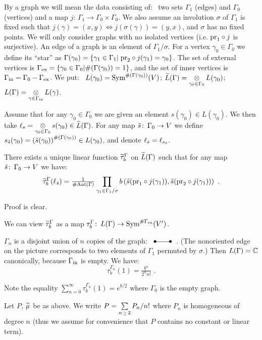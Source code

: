 By a graph we will mean the data consisting of: \
two sets $\Gamma_1$ (edges) and $\Gamma_0$ (vertices) and a
map $j\colon\,\Gamma_1\to\Gamma_0\times\Gamma_0$.
We also assume an involution $\sigma$ of $\Gamma_1$ is fixed
such that $j(\gamma)=(x,y)\Leftrightarrow j(\sigma(\gamma))=
(y,x)$, and $\sigma$ has no fixed points.
We will only consider graphs with no isolated vertices (i.e.
$\text{\rm pr}_1\circ j$ is surjective).
An edge of a graph is an element of $\Gamma_1/\sigma$.
For a vertex $\gamma_0\in\Gamma_0$ we define its ``star'' as
$\Gamma(\gamma_0)=\{\gamma_1\in\Gamma_1\vert \;
\text{\rm pr}_2\circ j(\gamma_1)=\gamma_0\}$.
The set of external vertices is $\Gamma_{\text{\rm ex}}=\{\gamma_0\in
\Gamma_0\vert \#(\Gamma(\gamma_0))=1\}$, and the set of
inner vertices is $\Gamma_{\text{\rm in}}=\Gamma_0-\Gamma_{\text{\rm ex}}$.
We put: \ $L(\gamma_0)=\text{\rm Sym}^{\#(\Gamma(\gamma_0))}(V)$;
$\Ltil(\Gamma)=\otimesop_{\gamma_0\in\Gamma_0}L(\gamma_0)$;
$L(\Gamma)=\otimesop_{\gamma\in\Gamma_{\In}}L(\gamma)$.

Assume that for any $\gamma_0\in\Gamma_0$ we are given an
element $s(\gamma_0)\in L(\gamma_0)$.
We then take $\ell_s=\otimesop_{\gamma_0\in\Gamma_0}
s(\gamma_0)\in\Ltil(\Gamma)$.
For any map $\tilde{s}\colon\,\Gamma_0\to V$ we define
$s_{\tilde{s}}(\gamma_0)=
\left(\tilde{s}(\gamma_0)\right)^{\#(\Gamma(\gamma_0))}\in
L(\gamma_0)$, and denote $\ell_{\tilde{s}}=\ell_{s_{\tilde{s}}}$.

There exists a unique linear function $\widetilde{\tau}_b^\Gamma$ on
$\widetilde{L}(\Gamma)$ such that for any map $\tilde{s}\colon\,\Gamma_0\to
V$ we have:
$$
\widetilde{\tau}_b^\Gamma(\ell_{\tilde{s}})=
\tfrac{1}{\#\text{\rm Aut}(\Gamma)}\prod\limits_{\gamma_1\in\Gamma_1/\sigma}
b\left(\tilde{s}(\text{\rm pr}_1\circ j(\gamma_1)),\tilde{s}(\text{\rm pr}_2\circ
j(\gamma_1))\right)\,\,.
$$
\endproclaim

\medskip\noindent
Proof is clear.

We can view $\widetilde{\tau}_b^\Gamma$ as a map
$\tau_b^\Gamma\colon\,L(\Gamma)\to\text{\rm Sym}^{\#\Gamma_{\text{\rm ex}}}(V')$.

$\Gamma_n$ is a disjoint union of $n$ copies of the graph: \
$\bullet\!\raise1.85pt
\hbox to 20pt{\hrulefill}\!\bullet\,\,\,$.
(The nonoriented edge on the picture corresponds to two
elements of $\Gamma_1$ permuted by $\sigma$.)
Then $L(\Gamma)={\Bbb C}$  canonically, because
$\Gamma_{\text{\rm in}}$ is empty.
We have:
$$
\tau_b^{\Gamma_n}(1)=\tfrac{b^n}{2^n n!}\,\,.
$$

Note the equality $\sum\limits_{n=0}^\infty
\tau_b^{\Gamma_n}(1)
=e^{b/2}$ where $\Gamma _0$ is the empty graph.


Let $P$, $\widetilde{\mu}$ be as above.
We write $P=\sum\limits_{n\Ge 2}
P_n /n!$ where $P_n$ 
is homogeneous of degree $n$ (thus we assume for
convenience that $P$ contains no constant or linear term).
\endexample

